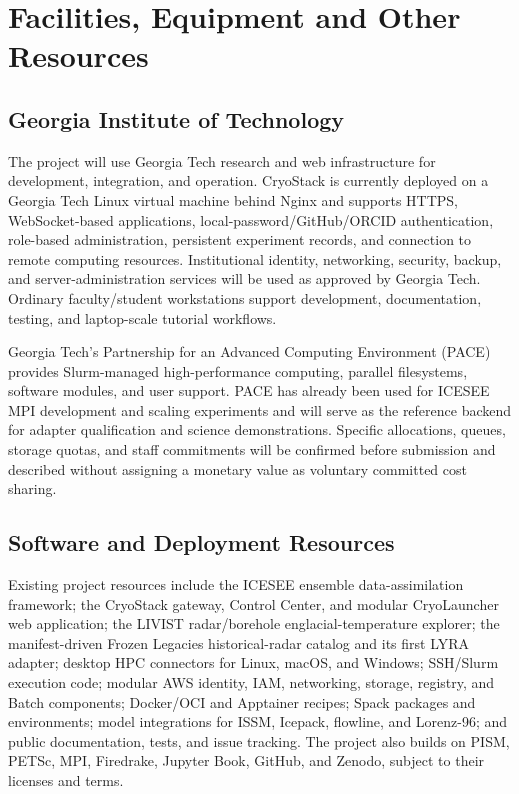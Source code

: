 \section*{Facilities, Equipment and Other Resources}

\subsection*{Georgia Institute of Technology}

The project will use Georgia Tech research and web infrastructure for
development, integration, and operation. CryoStack is currently deployed on a
Georgia Tech Linux virtual machine behind Nginx and supports HTTPS,
WebSocket-based applications, local-password/GitHub/ORCID authentication,
role-based administration, persistent experiment records, and connection to
remote computing resources. Institutional identity, networking, security,
backup, and server-administration services will be used as approved by Georgia
Tech. Ordinary faculty/student workstations support development, documentation,
testing, and laptop-scale tutorial workflows.

Georgia Tech's Partnership for an Advanced Computing Environment (PACE)
provides Slurm-managed high-performance computing, parallel filesystems,
software modules, and user support. PACE has already been used for ICESEE MPI
development and scaling experiments and will serve as the reference backend
for adapter qualification and science demonstrations. Specific allocations,
queues, storage quotas, and staff commitments will be confirmed before
submission and described without assigning a monetary value as voluntary
committed cost sharing.

\subsection*{Software and Deployment Resources}

Existing project resources include the ICESEE ensemble data-assimilation
framework; the CryoStack gateway, Control Center, and modular CryoLauncher web
application; the LIVIST radar/borehole englacial-temperature explorer; the
manifest-driven Frozen Legacies historical-radar catalog and its first LYRA
adapter; desktop HPC connectors for Linux, macOS, and Windows; SSH/Slurm
execution code; modular AWS identity, IAM, networking, storage, registry, and
Batch components; Docker/OCI and Apptainer
recipes; Spack packages and environments; model integrations for ISSM,
Icepack, flowline, and Lorenz-96; and public documentation, tests, and issue
tracking. The project also builds on PISM, PETSc, MPI, Firedrake, Jupyter Book,
GitHub, and Zenodo, subject to their licenses and terms.

